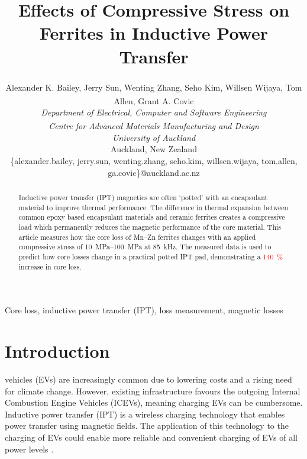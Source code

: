 \documentclass[conference]{IEEEtran}
\begin{document}
\title{Effects of Compressive Stress on Ferrites in Inductive Power Transfer}

\author{
  Alexander K. Bailey, Jerry Sun\textsuperscript{\textdagger}, Wenting Zhang, Seho Kim, Willsen Wijaya\textsuperscript{\textdagger}, Tom Allen\textsuperscript{\textdagger}, Grant A. Covic\\
  \textit{Department of Electrical, Computer and Software Engineering}\\
  \textit{\textsuperscript{\textdagger}Centre for Advanced Materials Manufacturing and Design}\\
  \textit{University of Auckland}\\
  Auckland, New Zealand\\
  \{alexander.bailey, jerry.sun, wenting.zhang, seho.kim, willsen.wijaya, tom.allen, ga.covic\}@auckland.ac.nz\\ 
}
\maketitle
\thispagestyle{plain}
\pagestyle{plain}

\begin{abstract}
  Inductive power transfer (IPT) magnetics are often `potted' with an encapsulant material to improve thermal performance.
  The difference in thermal expansion between common epoxy based encapsulant materials and ceramic ferrites creates a compressive load which permanently reduces the magnetic performance of the core material. 
  This article measures how the core loss of Mn--Zn ferrites changes with an applied compressive stress of \SIrange{10}{100}{\mega\pascal} at \SI{85}{\kilo\hertz}. 
  The measured data is used to predict how core losses change in a practical potted IPT pad, demonstrating a \textcolor{red}{\SI{140}{\percent}} increase in core loss. 
\end{abstract}

\begin{IEEEkeywords}
Core loss, inductive power transfer (IPT), loss measurement, magnetic losses
\end{IEEEkeywords}

\section{Introduction}

 vehicles (EVs) are increasingly common due to lowering costs and a rising need for climate change. 
However, existing infrastructure favours the outgoing Internal Combustion Engine Vehicles (ICEVs), meaning charging EVs can be cumbersome. 
Inductive power transfer (IPT) is a wireless charging technology that enables power transfer using magnetic fields. 
The application of this technology to the charging of EVs could enable more reliable and convenient charging of EVs of all power levels \cite{covicModernTrendsInductive2013b}. 
\end{document}
